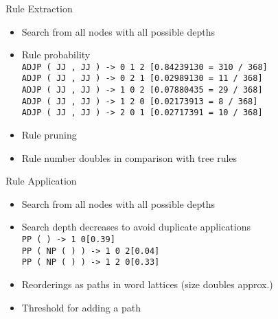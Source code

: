 \documentclass[18pt]{beamer}
\newcommand{\ul}[1]{{\color{red}{#1}}}
\begin{document}
\begin{frame}{Rule Extraction}
\begin{itemize}[<+-| alert@+>]
\item Search from all nodes with all possible depths
\item Rule probability
\bigskip \\
\texttt{ADJP ( JJ , JJ ) -> 0 1 2 \hphantom{xx}  [0.84239130 = 310 / 368]}\\
\texttt{ADJP ( JJ , JJ ) -> 0 2 1 \hphantom{xx}  [0.02989130 = \hphantom{x}11 / 368]}\\
\texttt{ADJP ( JJ , JJ ) -> 1 0 2 \hphantom{xx}  [0.07880435 =  \hphantom{x}29 / 368]}\\
\texttt{ADJP ( JJ , JJ ) -> 1 2 0 \hphantom{xx}  [0.02173913 =  \hphantom{xx}8 / 368]}\\
\texttt{ADJP ( JJ , JJ ) -> 2 0 1 \hphantom{xx}  [0.02717391 =  \hphantom{x}10 / 368]} \bigskip \\
\item Rule pruning
\item Rule number doubles in comparison with tree rules
\end{itemize}
\end{frame}

\begin{frame}{Rule Application}
\begin{itemize}[<+-| alert@+>]
\item Search from all nodes with all possible depths
\item Search depth decreases to avoid duplicate applications \bigskip \\
\texttt{PP ( \ul{IN$_0$} \ul{NP$_1$} ) -> 1 0\hspace{10em}[0.39]}\\
\texttt{PP ( \ul{IN$_0$} NP ( \ul{JJ$_1$} \ul{NNS$_2$} ) ) -> 1 0 2\hspace{3em}\hspace{1pt}[0.04]} \\
\texttt{PP ( \ul{IN$_0$} NP ( \ul{JJ$_1$} \ul{NNS$_2$} ) ) -> 1 2 0\hspace{3em}\hspace{1pt}[0.33]} \bigskip \\
\item Reorderings as paths in word lattices (size doubles approx.)
\item Threshold for adding a path
\end{itemize}
\end{frame}
\end{document}
